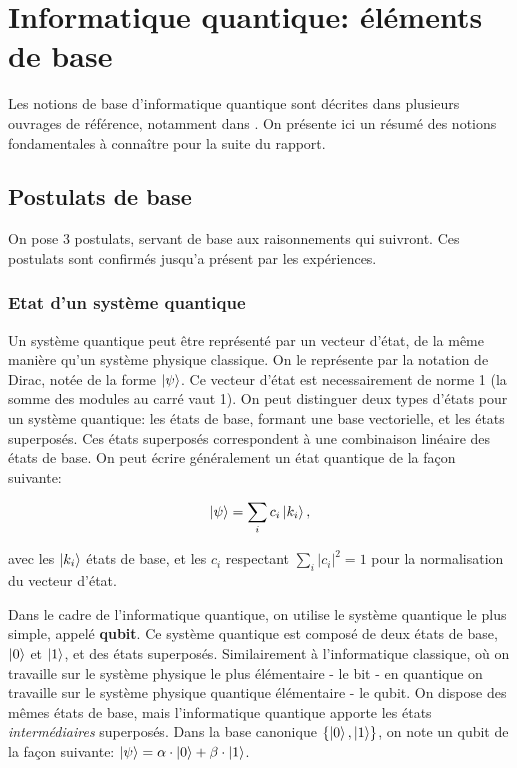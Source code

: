 \chapter{Informatique quantique: éléments de base}


Les notions de base d'informatique quantique sont décrites dans plusieurs ouvrages de référence, notamment dans \cite{Nielsen00, Mermin07}. On présente ici un résumé des notions fondamentales à connaître pour la suite du rapport.

\section{Postulats de base}

On pose 3 postulats, servant de base aux raisonnements qui suivront. Ces postulats sont confirmés jusqu'a présent par les expériences.

\subsection{Etat d'un système quantique}
Un système quantique peut être représenté par un vecteur d'état, de la même manière qu'un système physique classique. On le représente par la notation de Dirac, notée de la forme $\ket{\psi}$. Ce vecteur d'état est necessairement de norme 1 (la somme des modules au carré vaut 1). On peut distinguer deux types d'états pour un système quantique: les états de base, formant une base vectorielle, et les états superposés. Ces états superposés correspondent à une combinaison linéaire des états de base. On peut écrire généralement un état quantique de la façon suivante:

\begin{equation}
    \ket{\psi} = \displaystyle\sum_{i} c_i \ket{k_i},
\end{equation}

avec les $\ket{k_i}$ états de base, et les $c_i$ respectant $ \displaystyle\sum_{i} |c_i|^2 = 1$ pour la normalisation du vecteur d'état.

\medbreak

Dans le cadre de l'informatique quantique, on utilise le système quantique le plus simple, appelé \textbf{qubit}. Ce système quantique est composé de deux états de base, $\ket{0}$ et $\ket{1}$, et des états superposés. Similairement à l'informatique classique, où on travaille sur le système physique le plus élémentaire - le bit - en quantique on travaille sur le système physique quantique élémentaire - le qubit. On dispose des mêmes états de base, mais l'informatique quantique apporte les états \textit{intermédiaires} superposés. Dans la base canonique $\{\ket{0}, \ket{1}\}$, on note un qubit de la façon suivante: $\ket{\psi} = \alpha \cdot \ket{0} + \beta \cdot \ket{1}$.


